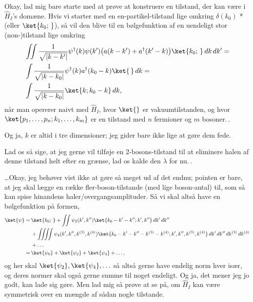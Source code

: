 \documentclass{report}
\begin{document}
Okay, lad mig bare starte med at prøve at konstruere en tilstand, der kan være i $\hat H_I$'s domæne. Hvis vi starter med en en-partikel-tilstand lige omkring $\delta(k_0)$ *(eller $\ket{k_0;\,}$), så vil den blive til en bølgefunktion af en uendeligt stor (non-)tilstand lige omkring
\begin{align}
\begin{aligned}
&\iint \frac{1}{\sqrt{|k - k'|}} \psi^\dagger(k)\psi(k') \big(a(k - k') + a^\dagger(k' - k)\big) \ket{k_0;\,}\,dk\,dk'
=\\
&\int \frac{1}{\sqrt{|k - k_0|}} \psi^\dagger(k) a^\dagger(k_0 - k) \ket{\,}\,dk
=\\
&\int \frac{1}{\sqrt{|k - k_0|}} \ket{k;k_0 - k}\,dk,
\end{aligned}
\end{align}
når man opererer naivt med $\hat H_I$, hvor $\ket{}$ er vakuumtilstanden, og hvor $\ket{p_1, \ldots, p_n ; k_1, \ldots, k_m}$ er en tilstand med $n$ fermioner og $m$ bosoner.\,.

Og ja, $k$ er altid i tre dimensioner; jeg gider bare ikke lige at gøre dem fede. 


Lad os så sige, at jeg gerne vil tilføje en 2-bosons-tilstand til at eliminere halen af denne tilstand helt efter en grænse, lad os kalde den $\lambda$ for nu.\,. 

\ldots Okay, jeg behøver vist ikke at gøre så meget ud af det endnu; pointen er bare, at jeg skal lægge en række fler-boson-tilstande (med lige boson-antal) til, som så kan spise hinandens haler/overgangsamplituder. Så vi skal altså have en bølgefunktion på formen,
\begin{align}
\begin{aligned}
\ket{\psi} = &\, \ket{k_0;\,} + \iint \psi_2(k', k'') \ket{k_0 - k' - k''; k', k''} \,dk' \,dk''\\
	&\,+  \iiiint \psi_4(k', k'', k^{(3)}, k^{(4)}) \ket{k_0 - k' - k'' - k^{(3)} - k^{(4)}; k', k'', k^{(3)}, k^{(4)}} \,dk' \,dk''\,dk^{(3)}\,dk^{(4)}\\
	&\,+  \ldots\\
= &\, \ket{\psi_0} + \ket{\psi_2} + \ket{\psi_4} + \ldots,
\end{aligned}
\end{align}
og her skal $\ket{\psi_2}, \ket{\psi_4}, \ldots$ så altså gerne have endelig norm hver især, og deres normer skal også gerne summe til noget endeligt. Og ja, det mener jeg jo godt, kan lade sig gøre. Men lad mig så prøve at se på, om $\hat H_I$ kan være symmetrisk over en mængde af sådan nogle tilstande.
\end{document}
